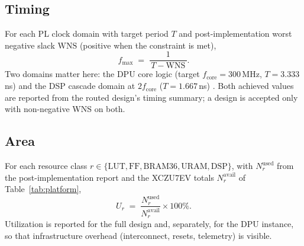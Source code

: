 \documentclass[onecolumn,journal]{IEEEtran}
\newcommand{\fmax}{f_{\mathrm{max}}}
\begin{document}
\subsection{Timing}
For each PL clock domain with target period $T$ and post-implementation worst negative
slack $\mathrm{WNS}$ (positive when the constraint is met),
\begin{equation}
\fmax \;=\; \frac{1}{\,T - \mathrm{WNS}\,}.
\label{eq:fmax}
\end{equation}
Two domains matter here: the DPU core logic (target $f_{\mathrm{core}}=300$\,MHz,
$T=3.333$\,ns) and the DSP cascade domain at $2f_{\mathrm{core}}$
($T=1.667$\,ns) \cite{amd_pg338}. Both achieved values are reported from the routed
design's timing summary; a design is accepted only with non-negative WNS on both.

\subsection{Area}
For each resource class $r \in \{\text{LUT},\text{FF},\text{BRAM36},\text{URAM},
\text{DSP}\}$, with $N_r^{\mathrm{used}}$ from the post-implementation report and the
XCZU7EV totals $N_r^{\mathrm{avail}}$ of Table~\ref{tab:platform},
\begin{equation}
U_r \;=\; \frac{N_r^{\mathrm{used}}}{N_r^{\mathrm{avail}}}\times 100\%.
\label{eq:util}
\end{equation}
Utilization is reported for the full design and, separately, for the DPU instance, so
that infrastructure overhead (interconnect, resets, telemetry) is visible.
\end{document}
